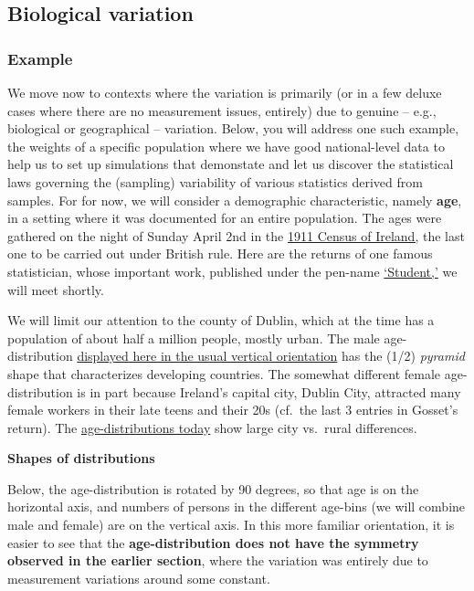 \documentclass[]{book}
\begin{document}
\hypertarget{biological-variation}{%
\subsection{Biological variation}\label{biological-variation}}

\hypertarget{example}{%
\subsubsection{Example}\label{example}}

We move now to contexts where the variation is primarily (or in a few deluxe cases where there are no measurement issues, entirely) due to genuine -- e.g., biological or geographical -- variation.
Below, you will address one such example, the weights of a specific population where we have good national-level data to help us to set up simulations that demonstate and let us discover the statistical laws governing the (sampling) variability of various statistics derived from samples. For for now, we will consider a demographic characteristic, namely \textbf{age}, in a setting where it was documented for an entire population. The ages were gathered on the night of Sunday April 2nd in the \href{http://www.census.nationalarchives.ie/help/about19011911census.html}{1911 Census of Ireland,} the last one to be carried out under British rule.
Here are the returns of one famous statistician, whose important work, published under the pen-name \href{http://www.census.nationalarchives.ie/reels/nai000230598/}{`Student,'} we will meet shortly.

We will limit our attention to the county of Dublin, which at the time has a population of about half a million people, mostly urban. The male age-distribution \href{http://www.medicine.mcgill.ca/epidemiology/hanley/bios601/MeanQuantiles2019.pdf\#page=18}{displayed here in the usual vertical orientation} has the (1/2) \emph{pyramid} shape that characterizes developing countries. The somewhat different female age-distribution is in part because Ireland's capital city, Dublin City, attracted many female workers in their late teens and their 20s (cf.~the last 3 entries in Gosset's return).
The \href{https://www.cso.ie/en/releasesandpublications/ep/p-cp3oy/cp3/aad/}{age-distributions today}
show large city vs.~rural differences.

\textbf{Shapes of distributions}

Below, the age-distribution is rotated by 90 degrees, so that age is on the horizontal axis, and numbers of persons in the different age-bins (we will combine male and female) are on the vertical axis. In this more familiar orientation, it is easier to see that the \textbf{age-distribution does not have the symmetry observed in the earlier section}, where the variation was entirely due to measurement variations around some constant.
\end{document}
